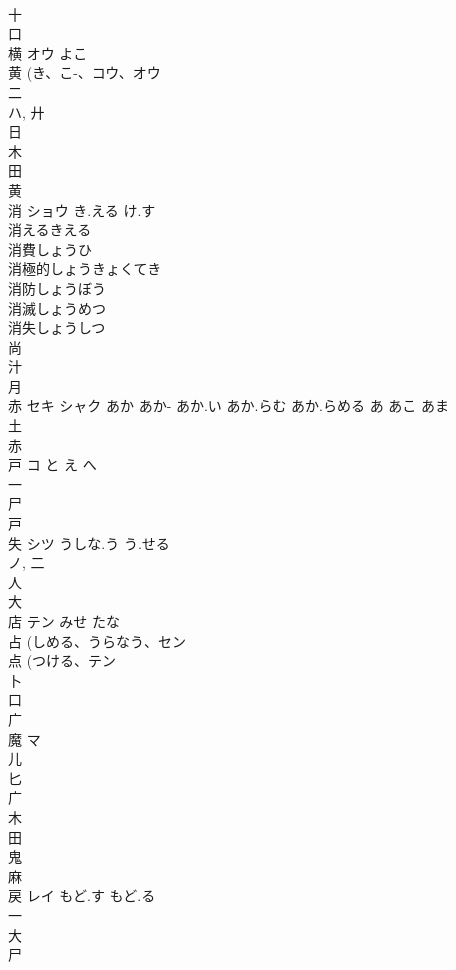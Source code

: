 \documentclass[8pt]{extreport}
\begin{document}
\begin{CJK}{UTF8}{min}
\\	十 
\\	口 
\\	横	オウ	よこ	
\\	黄 (き、こ-、コウ、オウ 
\\	二 
\\	ハ, 廾 
\\	日 
\\	木 
\\	田 
\\	黄 
\\	消	ショウ	き.える け.す	
\\	消えるきえる
\\	消費しょうひ
\\	消極的しょうきょくてき
\\	消防しょうぼう
\\	消滅しょうめつ
\\	消失しょうしつ
\\	尚 
\\	汁 
\\	月 
\\	赤	セキ シャク	あか あか- あか.い あか.らむ あか.らめる あ あこ あま	
\\	土 
\\	赤 
\\	戸	コ	と え へ	
\\	一 
\\	尸 
\\	戸 
\\	失	シツ	うしな.う う.せる	
\\	ノ, 二 
\\	人 
\\	大 
\\	店	テン	みせ たな	
\\	占 (しめる、うらなう、セン 
\\	点 (つける、テン 
\\	卜 
\\	口 
\\	广 
\\	魔	マ		
\\	儿 
\\	匕 
\\	广 
\\	木 
\\	田 
\\	鬼 
\\	麻 
\\	戻	レイ	もど.す もど.る	
\\	一 
\\	大 
\\	尸 

\end{CJK}
\end{document}
